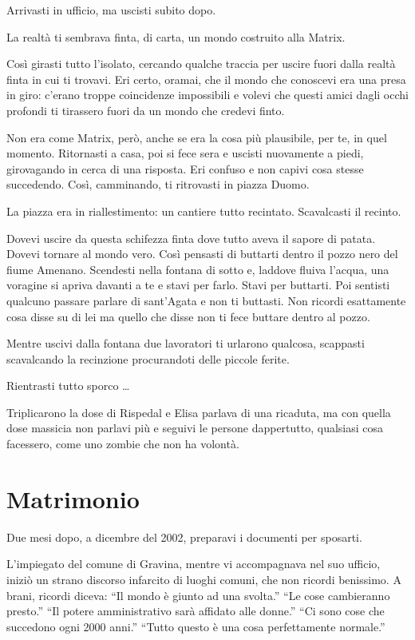 Arrivasti in ufficio, ma uscisti subito dopo.

La realtà ti sembrava finta, di carta, un mondo costruito alla Matrix.

Così girasti tutto l'isolato, cercando qualche traccia per uscire fuori dalla realtà finta in cui ti trovavi. Eri certo, oramai, che il mondo che conoscevi era una presa in giro: c'erano troppe coincidenze impossibili e volevi che questi amici dagli occhi profondi ti tirassero fuori da un mondo che credevi finto.

Non era come Matrix, però, anche se era la cosa più plausibile, per te, in quel momento. Ritornasti a casa, poi si fece sera e uscisti nuovamente a piedi, girovagando in cerca di una risposta. Eri confuso e non capivi cosa stesse succedendo. Così, camminando, ti ritrovasti in piazza Duomo.

La piazza era in riallestimento: un cantiere tutto recintato. Scavalcasti il recinto.

Dovevi uscire da questa schifezza finta dove tutto aveva il sapore di patata. Dovevi tornare al mondo vero. Così pensasti di buttarti dentro il pozzo nero del fiume Amenano. Scendesti nella fontana di sotto e, laddove fluiva l'acqua, una voragine si apriva davanti a te e stavi per farlo. Stavi per buttarti. Poi sentisti qualcuno passare parlare di sant'Agata e non ti buttasti. Non ricordi esattamente cosa disse su di lei ma quello che disse non ti fece buttare dentro al pozzo.

Mentre uscivi dalla fontana due lavoratori ti urlarono qualcosa, scappasti scavalcando la recinzione procurandoti delle piccole ferite.

Rientrasti tutto sporco \ldots

Triplicarono la dose di Rispedal e Elisa parlava di una ricaduta, ma con quella dose massicia non parlavi più e seguivi le persone dappertutto, qualsiasi cosa facessero, come uno zombie che non ha volontà.

\section{Matrimonio}
\label{matrimonio}

Due mesi dopo, a dicembre del 2002, preparavi i documenti per sposarti.

L'impiegato del comune di Gravina, mentre vi accompagnava nel suo ufficio, iniziò un strano discorso infarcito di luoghi comuni, che non ricordi benissimo. A brani, ricordi diceva: “Il mondo è giunto ad una svolta.” “Le cose cambieranno presto.” “Il potere amministrativo sarà affidato alle donne.” “Ci sono cose che succedono ogni 2000 anni.” “Tutto questo è una cosa perfettamente normale.”

